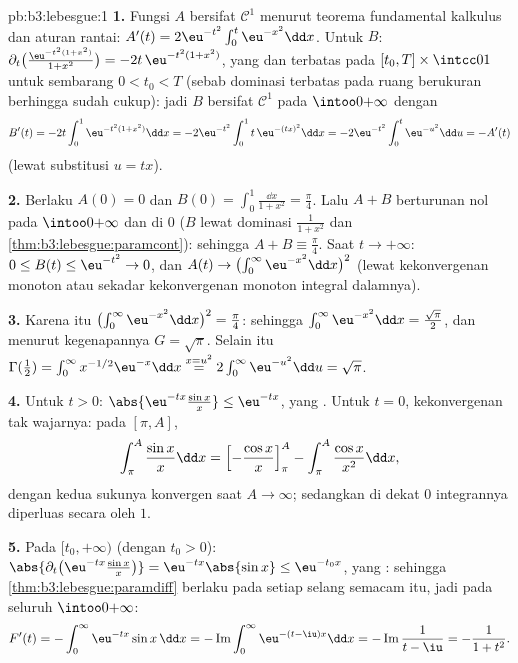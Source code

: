 \begin{solution}{pb:b3:lebesgue:1}
\textbf{1.} Fungsi $A$ bersifat $\mathcal C^1$ menurut teorema fundamental
kalkulus dan aturan rantai: $A'(t) =
2\eu^{-t^2}\int_0^t\eu^{-x^2}\dd x$. Untuk $B$:
$\partial_t\bigl(\frac{\eu^{-t^2(1+x^2)}}{1+x^2}\bigr) =
-2t\,\eu^{-t^2(1+x^2)}$, yang  dan terbatas pada $[t_0, T]
\times \intcc01$ untuk sembarang $0 < t_0 < T$ (sebab dominasi terbatas pada
ruang berukuran berhingga sudah cukup): jadi $B$ bersifat $\mathcal C^1$ pada
$\intoo0{+\infty}$ dengan
\[
B'(t) = -2t\int_0^1 \eu^{-t^2(1+x^2)}\dd x
= -2\eu^{-t^2}\int_0^1 t\,\eu^{-(tx)^2}\dd x
= -2\eu^{-t^2}\int_0^t\eu^{-u^2}\dd u = -A'(t)
\]
(lewat substitusi $u = tx$).

\textbf{2.} Berlaku $A(0) = 0$ dan $B(0) = \int_0^1\frac{\dd x}{1+x^2}
= \frac\pi4$. Lalu $A + B$ berturunan nol pada
$\intoo0{+\infty}$ dan  di $0$ ($B$ lewat
dominasi $\frac1{1+x^2}$ dan
\cref{thm:b3:lebesgue:paramcont}): sehingga $A + B \equiv \frac\pi4$.
Saat $t\to+\infty$: $0 \leq B(t) \leq \eu^{-t^2} \to 0$, dan
$A(t) \to \bigl(\int_0^\infty\eu^{-x^2}\dd x\bigr)^2$ (lewat kekonvergenan monoton atau
sekadar kekonvergenan monoton integral dalamnya).

\textbf{3.} Karena itu $\bigl(\int_0^\infty\eu^{-x^2}\dd x\bigr)^2
= \frac\pi4$: sehingga $\int_0^\infty\eu^{-x^2}\dd x =
\frac{\sqrt\pi}2$, dan menurut kegenapannya $G = \sqrt\pi$. Selain itu
$\Gamma(\frac12) = \int_0^\infty x^{-1/2}\eu^{-x}\dd x
\overset{x = u^2}{=} 2\int_0^\infty\eu^{-u^2}\dd u =
\sqrt\pi$.

\textbf{4.} Untuk $t > 0$: $\abs{\eu^{-tx}\frac{\sin x}x} \leq
\eu^{-tx}$, yang . Untuk $t = 0$, kekonvergenan tak wajarnya: pada
$[\pi, A]$,
\[
\int_\pi^A\frac{\sin x}x\dd x
= \Bigl[-\frac{\cos x}x\Bigr]_\pi^A -
\int_\pi^A\frac{\cos x}{x^2}\dd x,
\]
dengan kedua sukunya konvergen saat $A \to \infty$; sedangkan di dekat $0$ integrannya
diperluas secara  oleh $1$.

\textbf{5.} Pada $[t_0, +\infty)$ (dengan $t_0 > 0$):
$\abs{\partial_t\bigl(\eu^{-tx}\tfrac{\sin x}x\bigr)} =
\eu^{-tx}\abs{\sin x} \leq \eu^{-t_0x}$, yang : sehingga
\cref{thm:b3:lebesgue:paramdiff} berlaku pada setiap selang semacam
itu, jadi pada seluruh $\intoo0{+\infty}$:
\[
F'(t) = -\int_0^\infty\eu^{-tx}\sin x\,\dd x
= -\operatorname{Im}\int_0^\infty\eu^{-(t - \iu)x}\dd x
= -\operatorname{Im}\frac{1}{t - \iu} = -\frac{1}{1 + t^2}.
\]


\end{solution}
